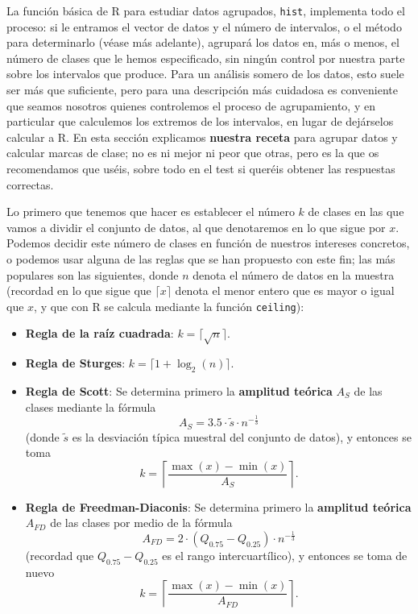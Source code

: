 \documentclass[
]{book}
\theoremstyle{definition}
\theoremstyle{definition}
\theoremstyle{definition}
\theoremstyle{remark}
\begin{document}
La función básica de R para estudiar datos agrupados, \texttt{hist}, implementa todo el proceso: si le entramos el vector de datos y el número de intervalos, o el método para determinarlo (véase más adelante), agrupará los datos en, más o menos, el número de clases que le hemos especificado, sin ningún control por nuestra parte sobre los intervalos que produce. Para un análisis somero de los datos, esto suele ser más que suficiente, pero para una descripción más cuidadosa es conveniente que seamos nosotros quienes controlemos el proceso de agrupamiento, y en particular que calculemos los extremos de los intervalos, en lugar de dejárselos calcular a R.
En esta sección explicamos \textbf{nuestra receta} para agrupar datos y calcular marcas de clase; no es ni mejor ni peor que otras, pero es la que os recomendamos que uséis, sobre todo en el test si queréis obtener las respuestas correctas.

Lo primero que tenemos que hacer es establecer el número \(k\) de clases en las que vamos a dividir el conjunto de datos, al que denotaremos en lo que sigue por \(x\). Podemos decidir este número de clases en función de nuestros intereses concretos, o podemos usar alguna de las reglas que se han propuesto con este fin; las más populares son las siguientes, donde \(n\) denota el número de datos en la muestra (recordad en lo que sigue que \(\lceil x \rceil\) denota el menor entero que es mayor o igual que \(x\), y que con R se calcula mediante la función \texttt{ceiling}):

\begin{itemize}
\item
  \textbf{Regla de la raíz cuadrada}: \(k=\big\lceil \sqrt{n}\big\rceil\).
\item
  \textbf{Regla de Sturges}: \(k= \big\lceil 1+\log_{2}(n)\big\rceil.\)
\item
  \textbf{Regla de Scott}: Se determina primero la \textbf{amplitud teórica} \(A_S\) de las clases mediante la fórmula
  \[
  A_S= 3.5\cdot \widetilde{s}\cdot n^{-\frac{1}{3}}
  \]
  (donde \(\widetilde{s}\) es la desviación típica muestral del conjunto de datos), y entonces se toma
  \[
  k=\left\lceil
  \frac{\max(x) -\min(x)}{A_S}\right\rceil.
  \]
\item
  \textbf{Regla de Freedman-Diaconis}: Se determina primero la \textbf{amplitud teórica} \(A_{FD}\) de las clases por medio de la fórmula
  \[
  A_{FD}= 2 \cdot (Q_{0.75}-Q_{0.25}) \cdot n^{-\frac{1}{3}}
  \]
  (recordad que \(Q_{0.75}-Q_{0.25}\) es el rango intercuartílico), y entonces se toma de nuevo
  \[
  k= \left\lceil \frac{\max(x) -\min(x)}{A_{FD}}\right\rceil.
  \]
\end{itemize}
\end{document}
